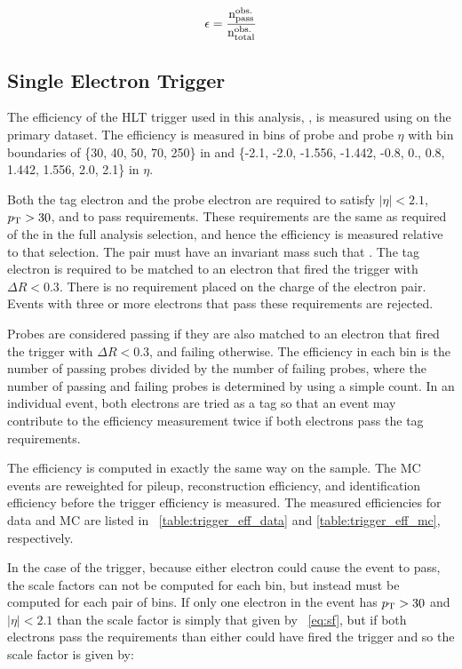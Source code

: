 \begin{equation}
    \label{eq:eff}
    \epsilon = \frac{
        \text{n}^{\text{obs.}}_{\text{pass}}
    }{
        \text{n}^{\text{obs.}}_{\text{total}}
    }
\end{equation}

\subsection{Single Electron Trigger}
\label{ssec:sf_trigger}

The efficiency of the HLT trigger used in this analysis,
\SingleElectronTrigger, is measured using \TnP on the primary dataset. The
efficiency is measured in bins of probe \pt and probe $\eta$ with bin
boundaries of \{30, 40, 50, 70, 250\} in \pt and \{-2.1, -2.0, -1.556, -1.442,
-0.8, 0., 0.8, 1.442, 1.556, 2.0, 2.1\} in $\eta$.

Both the tag electron and the probe electron are required to satisfy $|\eta| <
2.1$, $p_{\mathrm{T}} > 30$, and to pass \EGTIGHT requirements. These requirements are the
same as required of the \CentralElectron in the full analysis selection, and
hence the efficiency is measured relative to that selection. The pair must have
an invariant mass such that \MassRange. The tag electron is required to be
matched to an electron that fired the trigger with $\Delta R < 0.3$. There is
no requirement placed on the charge of the electron pair. Events with three or
more electrons that pass these requirements are rejected.

Probes are considered passing if they are also matched to an electron that
fired the trigger with $\Delta R < 0.3$, and failing otherwise. The efficiency
in each bin is the number of passing probes divided by the number of failing
probes, where the number of passing and failing probes is determined by using a
simple count. In an individual event, both electrons are tried as a tag so that
an event may contribute to the efficiency measurement twice if both electrons
pass the tag requirements.

The efficiency is computed in exactly the same way on the \MADGRAPH sample. The
MC events are reweighted for pileup, reconstruction efficiency, and
identification efficiency before the trigger efficiency is measured. The
measured efficiencies for data and MC are listed in
\TABS~\ref{table:trigger_eff_data} and \ref{table:trigger_eff_mc}, respectively.

In the case of the trigger, because either electron could cause the event to
pass, the scale factors can not be computed for each bin, but instead must be computed
for each pair of bins. If only one electron in the event has $p_{\mathrm{T}} > 30$ and
$|\eta| < 2.1$ than the scale factor is simply that given by \EQ~\ref{eq:sf}, but if both
electrons pass the requirements than either could have fired the trigger and so
the scale factor is given by:

